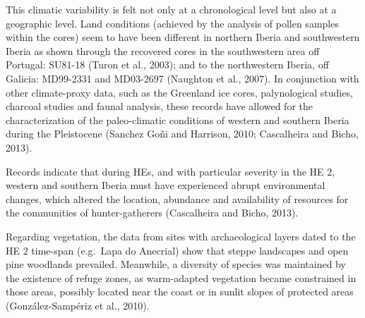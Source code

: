 \documentclass[12pt,twoside]{reedthesis}
\begin{document}
This climatic variability is felt not only at a chronological level but also at a geographic level. Land conditions (achieved by the analysis of pollen samples within the cores) seem to have been different in northern Iberia and southwestern Iberia as shown through the recovered cores in the southwestern area off Portugal: SU81-18 (Turon et al., 2003); and to the northwestern Iberia, off Galicia: MD99-2331 and MD03-2697 (Naughton et al., 2007). In conjunction with other climate-proxy data, such as the Greenland ice cores, palynological studies, charcoal studies and faunal analysis, these records have allowed for the characterization of the paleo-climatic conditions of western and southern Iberia during the Pleistocene (Sanchez Goñi and Harrison, 2010; Cascalheira and Bicho, 2013).

Records indicate that during HEs, and with particular severity in the HE 2, western and southern Iberia must have experienced abrupt environmental changes, which altered the location, abundance and availability of resources for the communities of hunter-gatherers (Cascalheira and Bicho, 2013).

Regarding vegetation, the data from sites with archaeological layers dated to the HE 2 time-span (e.g.~Lapa do Anecrial) show that steppe landscapes and open pine woodlands prevailed. Meanwhile, a diversity of species was maintained by the existence of refuge zones, as warm-adapted vegetation became constrained in those areas, possibly located near the coast or in sunlit slopes of protected areas (González-Sampériz et al., 2010).
\end{document}
